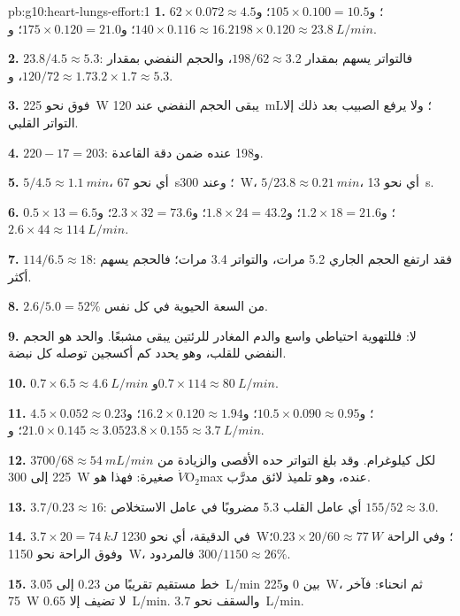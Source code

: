 \begin{solution}{pb:g10:heart-lungs-effort:1}
\textbf{1.} $62 \times 0.072 \approx 4.5$؛ و$105 \times 0.100 = 10.5$؛
و$140 \times 0.116 \approx 16.2$؛ و$175 \times 0.120 = 21.0$؛
و$198 \times 0.120 \approx \qty{23.8}{L/min}$.

\textbf{2.} $23.8/4.5 \approx 5.3$: فالتواتر يسهم بمقدار $198/62
\approx 3.2$، والحجم النفضي بمقدار $120/72 \approx 1.7$، و$3.2 \times
1.7 \approx 5.3$.

\textbf{3.} فوق نحو \qty{225}{W} يبقى الحجم النفضي عند \qty{120}{mL}؛
ولا يرفع الصبيب بعد ذلك إلا التواتر القلبي.

\textbf{4.} $220 - 17 = 203$: و198 عنده ضمن دقة القاعدة.

\textbf{5.} $5/4.5 \approx \qty{1.1}{min}$، أي نحو \qty{67}{s}؛ وعند
\qty{300}{W}، $5/23.8 \approx \qty{0.21}{min}$، أي نحو \qty{13}{s}.

\textbf{6.} $0.5 \times 13 = 6.5$؛ و$1.2 \times 18 = 21.6$؛ و$1.8 \times
24 = 43.2$؛ و$2.3 \times 32 = 73.6$؛ و$2.6 \times 44 \approx
\qty{114}{L/min}$.

\textbf{7.} $114/6.5 \approx 18$: فقد ارتفع الحجم الجاري 5.2 مرات،
والتواتر 3.4 مرات؛ فالحجم يسهم أكثر.

\textbf{8.} $2.6/5.0 = 52\%$ من السعة الحيوية في كل نفس.

\textbf{9.} لا: فللتهوية احتياطي واسع والدم المغادر للرئتين يبقى
مشبعًا. والحد هو الحجم النفضي للقلب، وهو يحدد كم أكسجين توصله كل نبضة.

\textbf{10.} $0.7 \times 6.5 \approx \qty{4.6}{L/min}$ و$0.7 \times
114 \approx \qty{80}{L/min}$.

\textbf{11.} $4.5 \times 0.052 \approx 0.23$؛ و$10.5 \times 0.090
\approx 0.95$؛ و$16.2 \times 0.120 \approx 1.94$؛ و$21.0 \times 0.145
\approx 3.05$؛ و$23.8 \times 0.155 \approx \qty{3.7}{L/min}$.

\textbf{12.} $3700/68 \approx \qty{54}{mL/min}$ لكل كيلوغرام. وقد بلغ
التواتر حده الأقصى والزيادة من 225 إلى \qty{300}{W} صغيرة: فهذا هو
$\dot V\!\mathrm{O_2}$max عنده، وهو تلميذ لائق مدرَّب.

\textbf{13.} $3.7/0.23 \approx 16$: أي عامل القلب 5.3 مضروبًا في عامل
الاستخلاص $155/52 \approx 3.0$.

\textbf{14.} $3.7 \times 20 = \qty{74}{kJ}$ في الدقيقة، أي نحو
\qty{1230}{W}؛ وفي الراحة $0.23 \times 20/60 \approx \qty{77}{W}$؛
وفوق الراحة نحو \qty{1150}{W}، فالمردود $300/1150 \approx
26\%$.

\textbf{15.} خط مستقيم تقريبًا من \num{0.23} إلى \qty{3.05}{L/min} بين
0 و\qty{225}{W}، ثم انحناء: فآخر \qty{75}{W} لا تضيف إلا
\qty{0.65}{L/min}. والسقف نحو \qty{3.7}{L/min}.


\end{solution}
